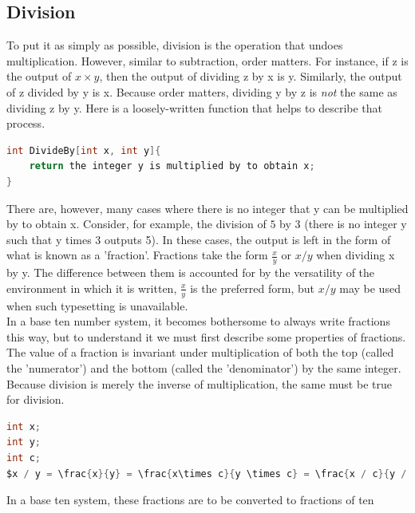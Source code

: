 \subsection{Division}
To put it as simply as possible, division is the operation that undoes multiplication. However, similar to subtraction, order matters. For instance, if z is the output of $x\times y$, then the output of dividing z by x is y. Similarly, the output of z divided by y is x. Because order matters, dividing y by z is \emph{not} the same as dividing z by y. Here is a loosely-written function that helps to describe that process.
\begin{center}
\begin{lstlisting}[language=C,caption=Division Function,label=lst:divFunc]
int DivideBy[int x, int y]{
	return the integer y is multiplied by to obtain x;
}
\end{lstlisting}
\end{center}
There are, however, many cases where there is no integer that y can be multiplied by to obtain x. Consider, for example, the division of $5$ by $3$ (there is no integer y such that y times 3 outputs 5). In these cases, the output is left in the form of what is known as a 'fraction'. Fractions take the form $\frac{x}{y}$ or $x/y$ when dividing x by y. The difference between them is accounted for by the versatility of the environment in which it is written, $\frac{x}{y}$ is the preferred form, but $x/y$ may be used when such typesetting is unavailable. \\
In a base ten number system, it becomes bothersome to always write fractions this way, but to understand it we must first describe some properties of fractions. \\
The value of a fraction is invariant under multiplication of both the top (called the 'numerator') and the bottom (called the 'denominator') by the same integer. Because division is merely the inverse of multiplication, the same must be true for division.
\begin{center}
\begin{lstlisting}[language=C,caption=Fraction Properties,label=lst:fracProp,mathescape]
int x;
int y;
int c;
$x / y = \frac{x}{y} = \frac{x\times c}{y \times c} = \frac{x / c}{y / c}$
\end{lstlisting}
\end{center}

In a base ten system, these fractions are to be converted to fractions of ten






















